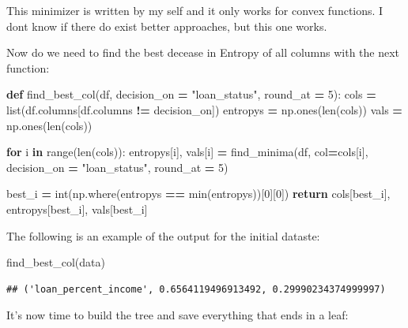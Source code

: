 \documentclass[
]{book}
\newenvironment{Shaded}{\begin{snugshade}}{\end{snugshade}}
\newcommand{\BuiltInTok}[1]{#1}
\newcommand{\ControlFlowTok}[1]{\textcolor[rgb]{0.13,0.29,0.53}{\textbf{#1}}}
\newcommand{\DecValTok}[1]{\textcolor[rgb]{0.00,0.00,0.81}{#1}}
\newcommand{\KeywordTok}[1]{\textcolor[rgb]{0.13,0.29,0.53}{\textbf{#1}}}
\newcommand{\NormalTok}[1]{#1}
\newcommand{\OperatorTok}[1]{\textcolor[rgb]{0.81,0.36,0.00}{\textbf{#1}}}
\newcommand{\StringTok}[1]{\textcolor[rgb]{0.31,0.60,0.02}{#1}}
\begin{document}
This minimizer is written by my self and it only works for convex functions. I dont know if there do exist better approaches, but this one works.

Now do we need to find the best decease in Entropy of all columns with the next function:

\begin{Shaded}
\begin{Highlighting}[]
\KeywordTok{def}\NormalTok{ find\_best\_col(df, decision\_on }\OperatorTok{=} \StringTok{"loan\_status"}\NormalTok{, round\_at }\OperatorTok{=} \DecValTok{5}\NormalTok{):}
\NormalTok{  cols }\OperatorTok{=} \BuiltInTok{list}\NormalTok{(df.columns[df.columns }\OperatorTok{!=}\NormalTok{ decision\_on])}
\NormalTok{  entropys }\OperatorTok{=}\NormalTok{ np.ones(}\BuiltInTok{len}\NormalTok{(cols))}
\NormalTok{  vals }\OperatorTok{=}\NormalTok{ np.ones(}\BuiltInTok{len}\NormalTok{(cols))}
  
  \ControlFlowTok{for}\NormalTok{ i }\KeywordTok{in} \BuiltInTok{range}\NormalTok{(}\BuiltInTok{len}\NormalTok{(cols)):}
\NormalTok{    entropys[i], vals[i] }\OperatorTok{=}\NormalTok{ find\_minima(df, col}\OperatorTok{=}\NormalTok{cols[i], decision\_on }\OperatorTok{=} \StringTok{"loan\_status"}\NormalTok{, round\_at }\OperatorTok{=} \DecValTok{5}\NormalTok{)}
  
\NormalTok{  best\_i }\OperatorTok{=} \BuiltInTok{int}\NormalTok{(np.where(entropys }\OperatorTok{==} \BuiltInTok{min}\NormalTok{(entropys))[}\DecValTok{0}\NormalTok{][}\DecValTok{0}\NormalTok{])}
  \ControlFlowTok{return}\NormalTok{ cols[best\_i], entropys[best\_i], vals[best\_i]}
\end{Highlighting}
\end{Shaded}

The following is an example of the output for the initial dataste:

\begin{Shaded}
\begin{Highlighting}[]
\NormalTok{find\_best\_col(data)}
\end{Highlighting}
\end{Shaded}

\begin{verbatim}
## ('loan_percent_income', 0.6564119496913492, 0.29990234374999997)
\end{verbatim}

It's now time to build the tree and save everything that ends in a leaf:
\end{document}
